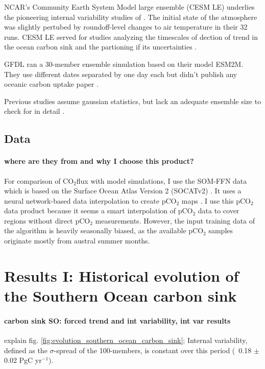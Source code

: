 \documentclass[12pt]{article}
\begin{document}
NCAR's Community Earth System Model large ensemble (CESM LE) \citep{Kay2015} underlies the pioneering internal variability studies of \citeauthor{Deser2012}. The initial state of the atmosphere  was slightly pertubed by roundoff-level changes to air temperature in their 32 runs. CESM LE served for studies analyzing the timescales of dection of trend in the ocean carbon sink \citep{McKinley2016} and the partioning if its uncertainties \citep{Lovenduski2016}.

GFDL ran a 30-member ensemble simulation based on their model ESM2M. They use different dates separated by one day each but didn't publish any oceanic carbon uptake paper \citep{Rodgers2015}.

Previous studies assume gaussian statistics, but lack an adequate ensemble size to check for in detail \citep{Thompson2015,Deser2012}.


\subsection{Data}
\paragraph{where are they from and why I choose this product?}
For comparison of CO$_2$flux with model simulations, I use the SOM-FFN data  which is based on the Surface Ocean Atlas Version 2 (SOCATv2) \citep{landschuetzer2016}. It uses a neural network-based data interpolation to create pCO$_2$ maps \citep{Landschuetzer2014}. I use this pCO$_2$ data product because it seems a smart interpolation of pCO$_2$ data to cover regions without direct pCO$_2$ measurements. However, the input training data of the algorithm is heavily seasonally biased, as the available pCO$_2$ samples originate mostly from austral summer months.




\clearpage

\section{Results I: Historical evolution of the Southern Ocean carbon sink}

\paragraph{carbon sink SO: forced trend and int variability, int var results} explain fig. \ref{fig:evolution_southern_ocean_carbon_sink}; 
Internal variability, defined as the $\sigma$-spread of the 100-members, is constant over this period (~0.18 $\pm$ 0.02 PgC yr$^{-1}$). 
\end{document}
